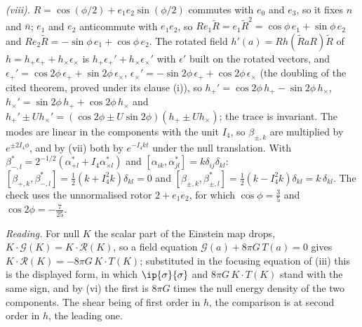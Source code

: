 \emph{(viii).} $R = \cos(\phi/2) + e_{1}e_{2}\sin(\phi/2)$ commutes with $e_{0}$ and $e_{3}$, so it fixes $n$ and $\bar n$; $e_{1}$ and $e_{2}$ anticommute with $e_{1}e_{2}$, so $Re_{1}\tilde R = e_{1}\tilde R^{2} = \cos\phi\,e_{1} + \sin\phi\,e_{2}$ and $Re_{2}\tilde R = -\sin\phi\,e_{1} + \cos\phi\,e_{2}$. The rotated field $h'(a) = Rh(\tilde RaR)\tilde R$ of $h = h_{+}\epsilon_{+} + h_{\times}\epsilon_{\times}$ is $h_{+}\epsilon_{+}' + h_{\times}\epsilon_{\times}'$ with $\epsilon'$ built on the rotated vectors, and $\epsilon_{+}' = \cos 2\phi\,\epsilon_{+} + \sin 2\phi\,\epsilon_{\times}$, $\epsilon_{\times}' = -\sin 2\phi\,\epsilon_{+} + \cos 2\phi\,\epsilon_{\times}$ (the doubling of the cited theorem, proved under its clause (i)), so $h_{+}' = \cos 2\phi\,h_{+} - \sin 2\phi\,h_{\times}$, $h_{\times}' = \sin 2\phi\,h_{+} + \cos 2\phi\,h_{\times}$ and $h_{+}' \pm Uh_{\times}' = (\cos 2\phi \pm U\sin 2\phi)(h_{+} \pm Uh_{\times})$; the trace is invariant. The modes are linear in the components with the unit $I_{4}$, so $\beta_{\pm,k}$ are multiplied by $e^{\pm 2I_{4}\phi}$, and by (vii) both by $e^{-I_{4}kt}$ under the null translation. With $\beta_{-,l}^{*} = 2^{-1/2}(\alpha_{+l}^{*} + I_{4}\alpha_{\times l}^{*})$ and $[\alpha_{ik}, \alpha_{jl}^{*}] = k\delta_{ij}\delta_{kl}$: $[\beta_{+,k}, \beta_{-,l}^{*}] = \tfrac12(k + I_{4}^{2}k)\delta_{kl} = 0$ and $[\beta_{\pm,k}, \beta_{\pm,l}^{*}] = \tfrac12(k - I_{4}^{2}k)\delta_{kl} = k\,\delta_{kl}$. The check uses the unnormalised rotor $2 + e_{1}e_{2}$, for which $\cos\phi = \tfrac35$ and $\cos 2\phi = -\tfrac{7}{25}$.

\emph{Reading.} For null $K$ the scalar part of the Einstein map drops, $K \cdot \mathcal{G}(K) = K \cdot \mathcal{R}(K)$, so a field equation $\mathcal{G}(a) + 8\pi G\,T(a) = 0$ gives $K \cdot \mathcal{R}(K) = -8\pi G\,K \cdot T(K)$; substituted in the focusing equation of (iii) this is the displayed form, in which $\ip{\sigma}{\sigma}$ and $8\pi G\,K \cdot T(K)$ stand with the same sign, and by (vi) the first is $8\pi G$ times the null energy density of the two components. The shear being of first order in $h$, the comparison is at second order in $h$, the leading one.
